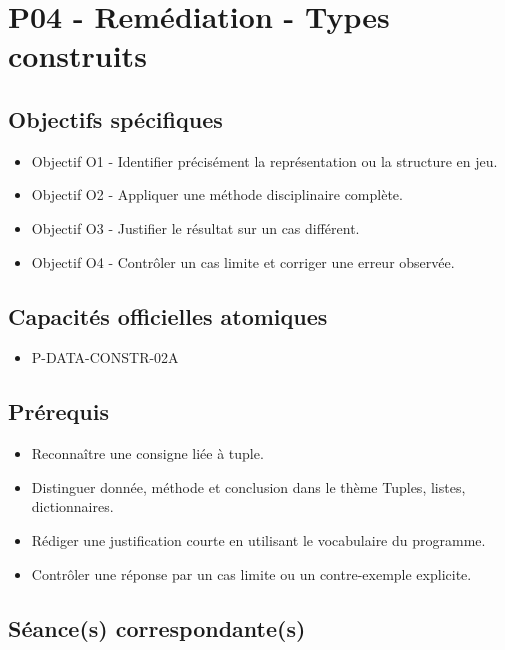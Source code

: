 \section{P04 - Remédiation - Types construits}

\subsection{Objectifs spécifiques}

\begin{itemize}
\tightlist
\item
  Objectif O1 - Identifier précisément la représentation ou la structure
  en jeu.
\item
  Objectif O2 - Appliquer une méthode disciplinaire complète.
\item
  Objectif O3 - Justifier le résultat sur un cas différent.
\item
  Objectif O4 - Contrôler un cas limite et corriger une erreur observée.
\end{itemize}

\subsection{Capacités officielles atomiques}

\begin{itemize}
\tightlist
\item
  P-DATA-CONSTR-02A
\end{itemize}

\subsection{Prérequis}

\begin{itemize}
\tightlist
\item
  Reconnaître une consigne liée à tuple.
\item
  Distinguer donnée, méthode et conclusion dans le thème Tuples, listes,
  dictionnaires.
\item
  Rédiger une justification courte en utilisant le vocabulaire du
  programme.
\item
  Contrôler une réponse par un cas limite ou un contre-exemple
  explicite.
\end{itemize}

\subsection{Séance(s) correspondante(s)}


